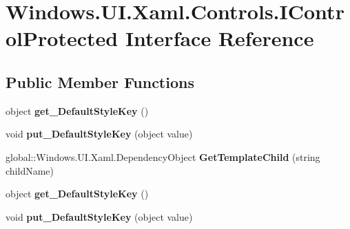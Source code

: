 \hypertarget{interface_windows_1_1_u_i_1_1_xaml_1_1_controls_1_1_i_control_protected}{}\section{Windows.\+U\+I.\+Xaml.\+Controls.\+I\+Control\+Protected Interface Reference}
\label{interface_windows_1_1_u_i_1_1_xaml_1_1_controls_1_1_i_control_protected}
\subsection*{Public Member Functions}
\begin{DoxyCompactItemize}
\item 
\mbox{\label{interface_windows_1_1_u_i_1_1_xaml_1_1_controls_1_1_i_control_protected_a78726a340c2a165e8f7c5acade8d3ff7}} 
object {\bfseries get\+\_\+\+Default\+Style\+Key} ()
\item 
\mbox{\label{interface_windows_1_1_u_i_1_1_xaml_1_1_controls_1_1_i_control_protected_a1ed23ea3ade8e163b61a3df46fd2362e}} 
void {\bfseries put\+\_\+\+Default\+Style\+Key} (object value)
\item 
\mbox{\label{interface_windows_1_1_u_i_1_1_xaml_1_1_controls_1_1_i_control_protected_a9d95d311e8cec4157bbe2bbd0ac7dc52}} 
global\+::\+Windows.\+U\+I.\+Xaml.\+Dependency\+Object {\bfseries Get\+Template\+Child} (string child\+Name)
\item 
\mbox{\label{interface_windows_1_1_u_i_1_1_xaml_1_1_controls_1_1_i_control_protected_a78726a340c2a165e8f7c5acade8d3ff7}} 
object {\bfseries get\+\_\+\+Default\+Style\+Key} ()
\item 
\mbox{\label{interface_windows_1_1_u_i_1_1_xaml_1_1_controls_1_1_i_control_protected_a1ed23ea3ade8e163b61a3df46fd2362e}} 
void {\bfseries put\+\_\+\+Default\+Style\+Key} (object value)
\item 

\end{DoxyCompactItemize}
